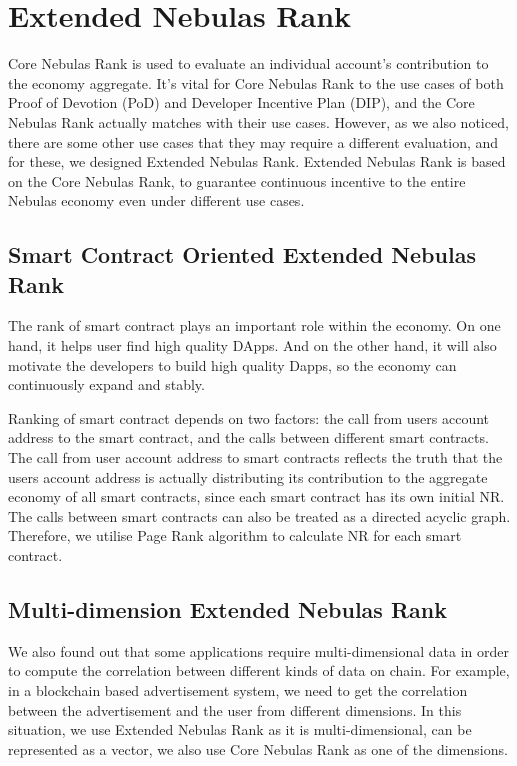 \section{Extended Nebulas Rank}
Core Nebulas Rank is used to evaluate an individual account’s contribution to the economy aggregate. It’s vital for Core Nebulas Rank to the use cases of both Proof of Devotion (PoD) and Developer Incentive Plan (DIP), and the Core Nebulas Rank actually matches with their use cases. However, as we also noticed, there are some other use cases that they may require a different evaluation, and for these, we designed Extended Nebulas Rank. Extended Nebulas Rank is based on the Core Nebulas Rank, to guarantee continuous incentive to the entire Nebulas economy even under different use cases.

\subsection{Smart Contract Oriented Extended Nebulas Rank}
The rank of smart contract plays an important role within the economy. On one hand, it helps user find high quality DApps. And on the other hand, it will also motivate the developers to build high quality Dapps, so the economy can continuously expand and stably.

Ranking of smart contract depends on two factors: the call from users account address to the smart contract, and the calls between different smart contracts. The call from user account address to smart contracts reflects the truth that the users account address is actually distributing its contribution to the aggregate economy of all smart contracts, since each smart contract has its own initial NR. The calls between smart contracts can also be treated as a directed acyclic graph. Therefore, we utilise Page Rank algorithm to calculate NR for each smart contract.



\subsection{Multi-dimension Extended Nebulas Rank}
We also found out that some applications require multi-dimensional data in order to compute the correlation between different kinds of data on chain. For example, in a blockchain based advertisement system, we need to get the correlation between the advertisement and the user from different dimensions. In this situation, we use Extended Nebulas Rank as it is multi-dimensional, can be represented as a vector, we also use Core Nebulas Rank as one of the dimensions.

